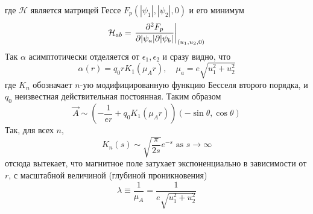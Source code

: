 где \( \mathcal{H} \) является матрицей Гессе \( F_p(|\psi_1|, |\psi_2|, 0) \) 
и его минимум
\begin{equation}
    \mathcal{H}_{ab} = \left. \frac{\partial^2 F_p}{\partial |\psi_a| \partial |\psi_b|} 
        \right|_{(u_1, u_2, 0)}
    \label{eq:12}
\end{equation}
Так \( \alpha \) асимптотически отделяется от \( \epsilon_1, \epsilon_2\) и 
сразу видно, что
\begin{equation}
    \alpha(r) = q_0 r K_1(\mu_A r), \quad
    \mu_a = e\sqrt{u_1^2 + u_2^2}
    \label{eq:13}
\end{equation}
где \( K_n \) обозначает \( n \)-ую модифицированную функцию Бесселя второго 
порядка, и \( q_0 \) неизвестная действительная постоянная. Таким образом
\begin{equation}
    \vec{A} \sim \left( -\frac{1}{er} + q_0 K_1(\mu_A r) \right)
        (-\sin\theta, \cos\theta)
    \label{eq:14}
\end{equation}
Так, для всех \( n \), 
\begin{equation}
    K_n(s) \sim \sqrt{\frac{\pi}{2s}}e^{-s} \text{ as } s \rightarrow \infty
    \label{eq:15}
\end{equation}
отсюда вытекает, что магнитное поле затухает экспоненциально в зависимости от 
\( r \), с масштабной величиной (глубиной проникновения)
\begin{equation}
    \lambda \equiv \frac{1}{\mu_A} = \frac{1}{e\sqrt{u_1^2 + u_2^2}}
    \label{eq:16}
\end{equation}

